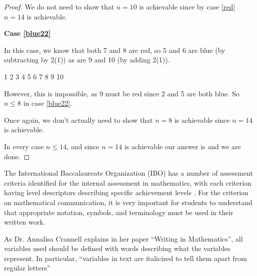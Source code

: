 \documentclass[a4paper,12pt]{scrartcl}
\newcommand{\red}{\color{red}}
\newcommand{\blue}{\color{blue}}
\newcommand{\black}{\color{black}}
\begin{document}
\begin{proof}
We do not need to show that $n=10$ is achievable since by case \ref{red} $n=14$ is achievable.

\textbf{Case \ref{blue22}}

In this case, we know that both 7 and 8 are red, so 5 and 6 are blue
(by subtracting by 2(1)) as are 9 and 10 (by adding 2(1)).
\begin{center}
	\red 1 \blue 2 3 \black 4 \blue 5 6 \red 7 8 \blue 9 10
\end{center}
However, this is impossible, as 9 must be red since 2 and 5 are both blue.
So $n \leq 8$ in case \ref{blue22}.

Once again, we don't actually need to show that $n=8$ is achievable
since $n=14$ is achievable.

In every case $n \leq 14$, and since $n=14$ is achievable our answer is  and we are done.

\end{proof}

The International Baccalaureate Organization (IBO) has a number of 
assessment criteria identified for the internal assessment in mathematics,
with each criterion having level descriptors describing specific achievement
levels \cite[p. 80]{ibo_aa-guide_2021}. For the criterion on mathematical 
communication, it is very important for students to understand that 
appropriate notation, symbols, and terminology must be used in their 
written work.

As Dr. Annalisa Crannell explains in her paper “Writing in Mathematics”, 
all variables used should be defined with words describing 
what the variables represent. In particular, 
``variables in text are italicized to tell them apart from regular letters''
\cite[p. 5]{crannell_writing_1994}

\printbibliography
\end{document}
